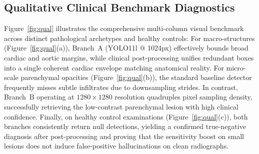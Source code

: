 \documentclass[10pt,twocolumn,letterpaper]{article}
\begin{document}
\begin{table}[t]
\centering
\caption{Detailed test-set performance of the Multi-Scale Decoupled Ensemble (YOLO11l @ 1024px + YOLO11m @ 1280px + WBF + TTA) across clinical macro-classes ($N=482$ test radiographs).}
\label{tab:ensemble_detail}
\small
{}
\end{table}

\subsection{Qualitative Clinical Benchmark Diagnostics}
Figure~\ref{fig:qual} illustrates the comprehensive multi-column visual benchmark across distinct pathological archetypes and healthy controls:
For macro-structures (Figure~\ref{fig:qual}(a)), Branch~A (YOLO11l @ 1024px) effectively bounds broad cardiac and aortic margins, while clinical post-processing unifies redundant boxes into a single coherent cardiac envelope matching anatomical reality.
For micro-scale parenchymal opacities (Figure~\ref{fig:qual}(b)), the standard baseline detector frequently misses subtle infiltrates due to downsampling strides. In contrast, Branch~B operating at $1280 \times 1280$ resolution quadruples pixel sampling density, successfully retrieving the low-contrast parenchymal lesion with high clinical confidence.
Finally, on healthy control examinations (Figure~\ref{fig:qual}(c)), both branches consistently return null detections, yielding a confirmed true-negative diagnosis after post-processing and proving that the sensitivity boost on small lesions does not induce false-positive hallucinations on clean radiographs.
\end{document}
